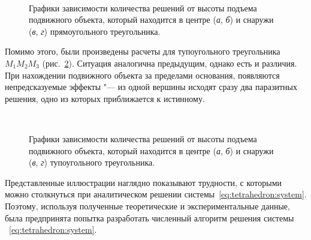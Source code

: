 \documentclass[../main.tex]{subfiles}
\begin{document}
\begin{figure}[tpb]
  \centering
  \qquad
  \\
  \qquad

  \caption{Графики зависимости количества решений от высоты подъема подвижного объекта, который находится в центре (\textit{а}, \textit{б}) и снаружи (\textit{в}, \textit{г}) прямоугольного треугольника.}
  \label{fig:tetrahedron:pic4}
\end{figure}

Помимо этого, были произведены расчеты для тупоугольного треугольника $M_1M_2M_3$ (рис.~\ref{fig:tetrahedron:pic5}). Ситуация аналогична предыдущим, однако есть и различия. При нахождении подвижного объекта за пределами основания, появляются непредсказуемые эффекты "--- из одной вершины исходят сразу два паразитных решения, одно из которых приближается к истинному.

\begin{figure}[tpb]
  \centering
  \qquad
  \\
  \qquad

  \caption{Графики зависимости количества решений от высоты подъема подвижного объекта, который находится в центре (\textit{а}, \textit{б}) и снаружи (\textit{в}, \textit{г}) тупоугольного треугольника.}
  \label{fig:tetrahedron:pic5}
\end{figure}

Представленные иллюстрации наглядно показывают трудности, с которыми можно столкнуться при аналитическом решении системы~\eqref{eq:tetrahedron:system}. Поэтому, используя полученные теоретические и экспериментальные данные, была предпринята попытка разработать численный алгоритм решения системы ~\eqref{eq:tetrahedron:system}.
\end{document}
